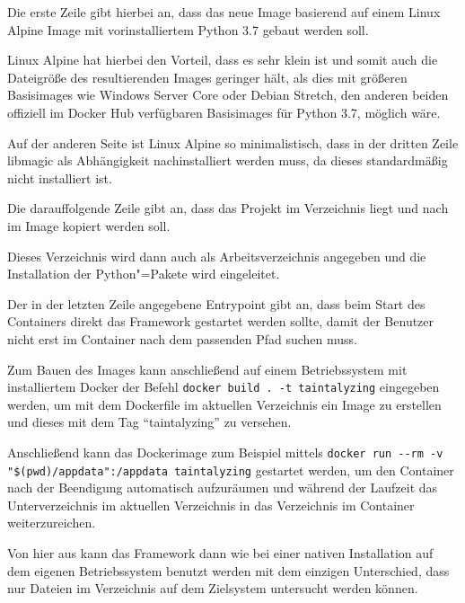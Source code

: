         Die erste Zeile gibt hierbei an,
        dass das neue Image basierend auf einem Linux Alpine Image mit vorinstalliertem Python 3.7 gebaut werden soll.

        Linux Alpine hat hierbei den Vorteil,
        dass es sehr klein ist und
        somit auch die Dateigröße des resultierenden Images geringer hält,
        als dies mit größeren Basisimages wie Windows Server Core oder
        Debian Stretch,
        den anderen beiden offiziell im Docker Hub verfügbaren Basisimages für Python 3.7,
        möglich wäre.

        Auf der anderen Seite ist Linux Alpine so minimalistisch,
        dass in der dritten Zeile libmagic als Abhängigkeit nachinstalliert werden muss,
        da dieses standardmäßig nicht installiert ist.

        Die darauffolgende Zeile gibt an,
        dass das Projekt im Verzeichnis
         liegt und
        nach
         im Image kopiert werden soll.

        Dieses Verzeichnis wird dann auch als Arbeitsverzeichnis angegeben und
        die Installation der Python"=Pakete wird eingeleitet.

        Der in der letzten Zeile angegebene Entrypoint gibt an,
        dass beim Start des Containers direkt das Framework gestartet werden sollte,
        damit der Benutzer nicht erst im Container nach dem passenden Pfad suchen muss.

        Zum Bauen des Images kann anschließend auf einem Betriebssystem mit installiertem Docker der Befehl
        \lstinline{docker build . -t taintalyzing} eingegeben werden,
        um mit dem Dockerfile im aktuellen Verzeichnis ein Image zu erstellen und
        dieses mit dem Tag
        \enquote{taintalyzing} zu versehen.

        Anschließend kann das Dockerimage zum Beispiel mittels
        \lstinline{docker run --rm -v "$(pwd)/appdata":/appdata taintalyzing}
        gestartet werden,
        um den Container nach der Beendigung automatisch aufzuräumen und
        während der Laufzeit das Unterverzeichnis
         im aktuellen Verzeichnis in das Verzeichnis
         im Container weiterzureichen.

        Von hier aus kann das Framework dann
        wie bei einer nativen Installation auf dem eigenen Betriebssystem benutzt werden mit dem einzigen Unterschied,
        dass nur Dateien im Verzeichnis
         auf dem Zielsystem untersucht werden können.

